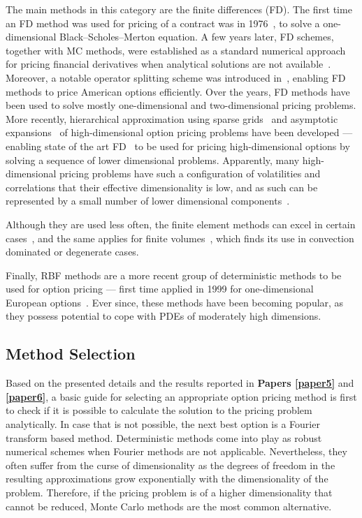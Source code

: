 \documentclass{UUThesisTemplate}
\begin{document}
\par
The main methods in this category are the finite differences (FD). The first time an FD method was used for pricing of a contract was in 1976~\cite{brennan1976pricing}, to solve a one-dimensional Black--Scholes--Merton equation. A few years later, FD schemes, together with MC methods, were established as a standard numerical approach for pricing financial derivatives when analytical solutions are not available~\cite{brennan1978finite}. Moreover, a notable operator splitting scheme was introduced in~\cite{ikonen2004operator}, enabling FD methods to price American options efficiently. Over the years, FD methods have been used to solve mostly one-dimensional and two-dimensional pricing problems. More recently, hierarchical approximation using sparse grids~\cite{reisinger2007efficient} and asymptotic expansions~\cite{reisinger2015numerical} of high-dimensional option pricing problems have been developed --- enabling state of the art FD~\cite{foulon2010adi, haentjens2012adi} to be used for pricing high-dimensional options by solving a sequence of lower dimensional problems. Apparently, many high-dimensional pricing problems have such a configuration of volatilities and correlations that their effective dimensionality is low, and as such can be represented by a small number of lower dimensional components~\cite{wang2005high}.

\par
Although they are used less often, the finite element methods can excel in certain cases~\cite{zvan1998general, forsyth1999finite, heinecke2012highly}, and the same applies for finite volumes~\cite{zvan2001finite}, which finds its use in convection dominated or degenerate cases.

\par
Finally, RBF methods are a more recent group of deterministic methods to be used for option pricing --- first time applied in 1999 for one-dimensional European options~\cite{hon1999radial}. Ever since, these methods have been becoming popular, as they possess potential to cope with PDEs of moderately high dimensions.
%



%
\subsection{Method Selection}

\par
Based on the presented details and the results reported in \textbf{Papers \ref{paper5}} and \textbf{\ref{paper6}}, a basic guide for selecting an appropriate option pricing method is first to check if it is possible to calculate the solution to the pricing problem analytically. In case that is not possible, the next best option is a Fourier transform based method. Deterministic methods come into play as robust numerical schemes when Fourier methods are not applicable. Nevertheless, they often suffer from the curse of dimensionality as the degrees of freedom in the resulting approximations grow exponentially with the dimensionality of the problem. Therefore, if the pricing problem is of a higher dimensionality that cannot be reduced, Monte Carlo methods are the most common alternative.
\end{document}
